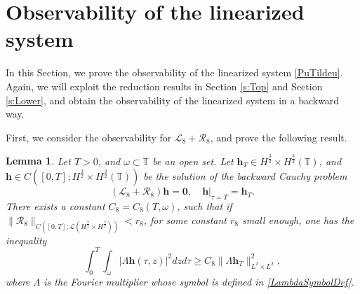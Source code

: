 \documentclass[12pt]{amsart}
\newtheorem{lemma}[theorem]{Lemma}
\theoremstyle{remark}
\theoremstyle{definition}
\numberwithin{equation}{section}
\newcommand{\f}{\frac}
\newcommand{\T}{{\mathbb T}}
\newcommand{\mL}{\mathcal{L}}
\newcommand{\mR}{\mathcal{R}}
\begin{document}
 
\section{Observability of the linearized system} \label{s:Observe}
In this Section, we prove the observability of the linearized system \eqref{PuTildeu}.
Again, we will exploit the reduction results in Section \ref{s:Top} and Section \ref{s:Lower}, and obtain the observability of the linearized system in a backward way.

First, we consider the observability for $\mL_8 + \mR_8$, and prove the following result.
\begin{lemma} \label{t:ObserveEight}
Let $T>0$,  and $\omega \subset \T$ be an open set.
Let $\textbf{h}_T \in H^{\f32} \times H^{\f32}(\T)$, and $\textbf{h} \in C([0,T]; H^{\f32}\times H^{\f32}(\T))$ be the solution of the backward Cauchy problem 
\begin{equation} \label{BackmLCauchy8}
 (\mL_8 + \mR_8)\mathbf{h} = \mathbf{0}, \quad \mathbf{h}|_{\tau=T} = \mathbf{h}_{T}.  
\end{equation}
There exists a constant $C_8 = C_8(T,\omega)$, such that if $\| \mR_8\|_{C([0,T]; \mL(H^{\f32}\times H^{\f32}))}< r_8$, for some constant $r_8$ small enough, one has the inequality
\begin{equation}\label{ObserveEight}
    \int_0^T \int_\omega |\Lambda\mathbf{h}(\tau,z)|^2 dzd\tau \geq C_8 \| \Lambda\mathbf{h}_{T}\|_{L^2\times L^2}^2,
\end{equation}
where $\Lambda$ is the Fourier multiplier whose symbol is defined in \eqref{LambdaSymbolDef}.
\end{lemma}
\end{document}
